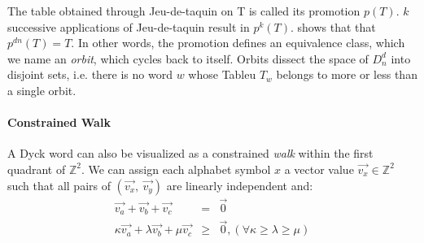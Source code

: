 \documentclass[nonatbib,numbers,10pt]{sigplanconf}
\begin{document}
The table obtained through Jeu-de-taquin on T is called its promotion $p(T)$. $k$ successive applications of Jeu-de-taquin result in $p^k(T)$. \cite{haiman} shows that that $p^{dn}(T)=T$. In other words, the promotion defines an equivalence class, which we name an \textit{orbit}, which cycles back to itself. Orbits dissect the space of $D^d_n$ into disjoint sets, i.e. there is no word $w$ whose Tableu $T_w$ belongs to more or less than a single orbit.
\paragraph{Constrained Walk}
A Dyck word can also be visualized as a constrained \textit{walk} within the first quadrant of $\mathbb{Z}^2$. We can assign each alphabet symbol $x$ a vector value $\vec{v_x} \in \mathbb{Z}^2$ such that all pairs of $(\vec{v_x},\ \vec{v_y})$ are linearly independent and:
\begin{eqnarray}
\vec{v_a} + \vec{v_b} + \vec{v_c} &=& \vec{0} \\
\kappa\vec{v_a} + \lambda\vec{v_b} + \mu\vec{v_c} &\geq & \vec{0},  (\forall \kappa \geq \lambda \geq \mu)
\end{eqnarray}
\end{document}
